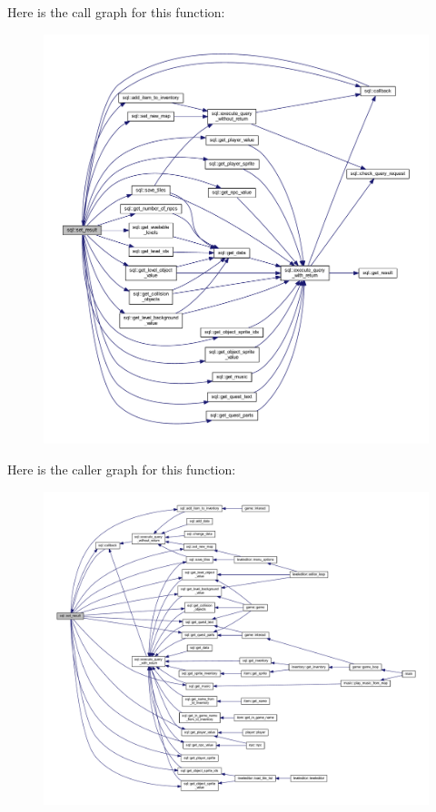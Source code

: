 Here is the call graph for this function\+:
\nopagebreak
\begin{figure}[H]
\begin{center}
\leavevmode
\includegraphics[width=350pt]{classsql_ad28cc81f2ee03c6a15d26ff216353d71_cgraph}
\end{center}
\end{figure}
Here is the caller graph for this function\+:
\nopagebreak
\begin{figure}[H]
\begin{center}
\leavevmode
\includegraphics[width=350pt]{classsql_ad28cc81f2ee03c6a15d26ff216353d71_icgraph}
\end{center}
\end{figure}


